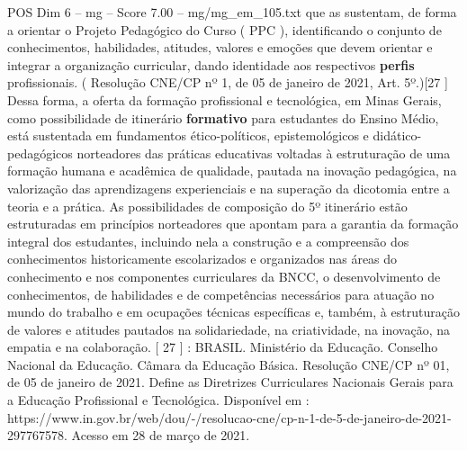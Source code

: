 \begin{textsample}{POS Dim 6 – mg – Score 7.00 – mg/mg\_em\_105.txt}
que as sustentam, de forma a orientar o Projeto Pedagógico do Curso ( PPC ), identificando o conjunto de conhecimentos, habilidades, atitudes, valores e emoções que devem orientar e integrar a organização curricular, dando identidade aos respectivos \textbf{perfis} profissionais. ( Resolução CNE/CP nº 1, de 05 de janeiro de 2021, Art. 5º.)[27 ] Dessa forma, a oferta da formação profissional e tecnológica, em Minas Gerais, como possibilidade de itinerário \textbf{formativo} para estudantes do Ensino Médio, está sustentada em fundamentos ético-políticos, epistemológicos e didático-pedagógicos norteadores das práticas educativas voltadas à estruturação de uma formação humana e acadêmica de qualidade, pautada na inovação pedagógica, na valorização das aprendizagens experienciais e na superação da dicotomia entre a teoria e a prática.
As possibilidades de composição do 5º itinerário estão estruturadas em princípios norteadores que apontam para a garantia da formação integral dos estudantes, incluindo nela a construção e a compreensão dos conhecimentos historicamente escolarizados e organizados nas áreas do conhecimento e nos componentes curriculares da BNCC, o desenvolvimento de conhecimentos, de habilidades e de competências necessários para atuação no mundo do trabalho e em ocupações técnicas específicas e, também, à estruturação de valores e atitudes pautados na solidariedade, na criatividade, na inovação, na empatia e na colaboração. [ 27 ] : BRASIL.
Ministério da Educação.
Conselho Nacional da Educação.
Câmara da Educação Básica.
Resolução CNE/CP nº 01, de 05 de janeiro de 2021.
Define as Diretrizes Curriculares Nacionais Gerais para a Educação Profissional e Tecnológica.
Disponível em : https://www.in.gov.br/web/dou/-/resolucao-cne/cp-n-1-de-5-de-janeiro-de-2021-297767578.
Acesso em 28 de março de 2021.

\end{textsample}
